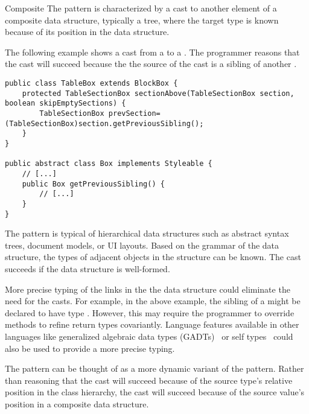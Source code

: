 \begin{pattern}{Composite}
The \thisp{} pattern is characterized by a cast to another element of a
composite data structure, typically a tree, where the target type is known because of its
position in the data structure.

\instances{}
The following example%
\def\urlvar{http://bit.ly/flyingsaucerproject_flyingsaucer_2N2nYbY}
shows a cast from a  to a .
The programmer reasons that the cast will succeed because the 
the source of the cast is a sibling of another .

\begin{verbatim}
public class TableBox extends BlockBox {
    protected TableSectionBox sectionAbove(TableSectionBox section, boolean skipEmptySections) {
        TableSectionBox prevSection=(TableSectionBox)section.getPreviousSibling();
    }
}

public abstract class Box implements Styleable {
    // [...]
    public Box getPreviousSibling() {
        // [...]
    }
}
\end{verbatim}

\discussion{}
The pattern is typical of hierarchical data structures such as abstract syntax
trees, document models, or UI layouts. Based on the grammar of 
the data structure, the types of adjacent objects in the structure can be known.
The cast succeeds if the data structure is well-formed.

More precise typing of the links in the the data structure could 
eliminate the need for the casts. For example, in the above example,
the sibling of a  might be declared to have type
. However, this may require the programmer to override
methods to refine return types covariantly.
Language features available in other languages like generalized algebraic data types
  (GADTs)~\cite{gadts} or self types~\cite{bruceChallengingTypingIssues2003,scalaIndependentlyExtensible} could also be 
used to provide a more precise typing.

The pattern can be thought of as a more dynamic variant of the
 pattern. Rather than
reasoning that the cast will succeed because of the source type's relative position in the 
class hierarchy, the cast will succeed because of the source value's position
in a composite data structure.

\end{pattern}
